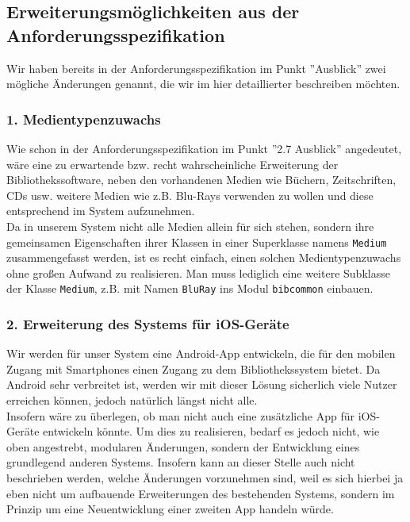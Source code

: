 \documentclass[fontsize=12pt,paper=a4,twoside]{scrartcl}
\begin{document}
\subsection*{Erweiterungsmöglichkeiten aus der Anforderungsspezifikation}

Wir haben bereits in der Anforderungsspezifikation im Punkt ''Ausblick'' zwei mögliche Änderungen genannt, die wir im hier detaillierter beschreiben möchten. 

\subsubsection*{1. Medientypenzuwachs}

Wie schon in der Anforderungsspezifikation im Punkt ''2.7 Ausblick'' angedeutet, wäre eine zu erwartende bzw. recht wahrscheinliche Erweiterung der Bibliothekssoftware, neben den vorhandenen Medien wie Büchern, Zeitschriften, CDs usw. weitere Medien wie z.B. Blu-Rays verwenden zu wollen und diese entsprechend im System aufzunehmen.\\
Da in unserem System nicht alle Medien allein für sich stehen, sondern ihre gemeinsamen Eigenschaften ihrer Klassen in einer Superklasse namens \texttt{Medium} zusammengefasst werden, ist es recht einfach, einen solchen Medientypenzuwachs ohne großen Aufwand zu realisieren. Man muss lediglich eine weitere Subklasse der Klasse \texttt{Medium}, z.B. mit Namen \texttt{BluRay} ins Modul \texttt{bibcommon} einbauen.

\subsubsection*{2. Erweiterung des Systems für iOS-Geräte}

Wir werden für unser System eine Android-App entwickeln, die für den mobilen Zugang mit Smartphones einen Zugang zu dem Bibliothekssystem bietet. Da Android sehr verbreitet ist, werden wir mit dieser Lösung sicherlich viele Nutzer erreichen können, jedoch natürlich längst nicht alle. \\
Insofern wäre zu überlegen, ob man nicht auch eine zusätzliche App für iOS-Geräte entwickeln könnte. Um dies zu realisieren, bedarf es jedoch nicht, wie oben angestrebt, modularen Änderungen, sondern der Entwicklung eines grundlegend anderen Systems. Insofern kann an dieser Stelle auch nicht beschrieben werden, welche Änderungen vorzunehmen sind, weil es sich hierbei ja eben nicht um aufbauende Erweiterungen des bestehenden Systems, sondern im Prinzip um eine Neuentwicklung einer zweiten App handeln  würde.
\end{document}
